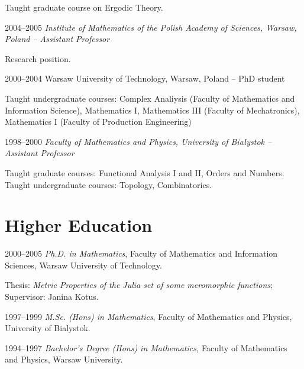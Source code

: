\documentclass{article}
\begin{document}
\begin{CV}
  Taught graduate course on Ergodic Theory.
\item[2004--2005] {\em Institute of Mathematics of the Polish Academy of
    Sciences, Warsaw, Poland -- Assistant Professor}

  Research position.
\item[2000--2004] {Warsaw University of Technology, Warsaw, Poland --
    PhD student}

  Taught undergraduate courses: Complex Analiysis (Faculty of
  Mathematics and Information Science), Mathematics I, Mathematics III
  (Faculty of Mechatronics), Mathematics I (Faculty of Production Engineering)
\item[1998--2000] {\em Faculty of Mathematics and Physics, University
    of Bia{\l}ystok -- Assistant Professor}

  Taught graduate courses: Functional Analysis I and II, Orders and
  Numbers.  Taught undergraduate courses: Topology, Combinatorics.
\end{CV}



\section{Higher Education}
\begin{CV}
\item[2000--2005] \emph{Ph.D. in Mathematics}, Faculty of Mathematics and
  Information Sciences, Warsaw University of Technology.

  Thesis: \emph{Metric Properties of the Julia set of some meromorphic
    functions}; Supervisor: Janina Kotus.

\item[1997--1999] \emph{M.Sc. (Hons) in Mathematics}, Faculty of Mathematics
  and Physics, University of Bialystok.

\item[1994--1997] {\em Bachelor's Degree (Hons) in Mathematics,} Faculty of
  Mathematics and Physics, Warsaw University.
  

\end{CV}
\end{document}

